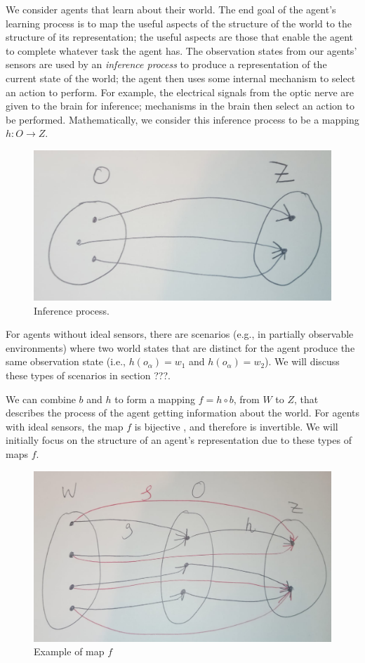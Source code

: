 We consider agents that learn about their world.
The end goal of the agent’s learning process is to map the useful aspects of the structure of the world to the structure of its representation; the useful aspects are those that enable the agent to complete whatever task the agent has.
The observation states from our agents' sensors are used by an \emph{inference process} to produce a representation of the current state of the world; the agent
then uses some internal mechanism to select an action to perform.
For example, the electrical signals from the optic nerve are given to the brain for inference; mechanisms in the brain then select an action to be performed. 
Mathematically, we consider this inference process to be a mapping $h: O \to Z$.
\begin{figure}
    \centering
    \includegraphics[width=0.5\linewidth]{2MathematicalFramework/InitialFramework/Images/inference_process_O_to_Z.jpeg}
    \caption{
    Inference process.
    }
    \label{fig:inference_process_O_to_Z}
\end{figure}

For agents without ideal sensors, there are scenarios (e.g., in partially observable environments) where two world states that are distinct for the agent produce the same observation state (i.e., $h(o_{\alpha}) = w_{1}$ and $h(o_{\alpha}) = w_{2}$).
We will discuss these types of scenarios in section ???.

We can combine $b$ and $h$ to form a mapping $f = h \circ b$, from $W$ to $Z$, that describes the process of the agent getting information about the world.
For agents with ideal sensors, the map $f$ is bijective
, and therefore is invertible.
We will initially focus on the structure of an agent's representation due to these types of maps $f$.
\begin{figure}
    \centering
    \includegraphics[width=0.5\linewidth]{2MathematicalFramework/InitialFramework/Images/W_to_Z.jpeg}
    \caption{
    Example of map $f$
    }
    \label{fig:W_to_Z}
\end{figure}


